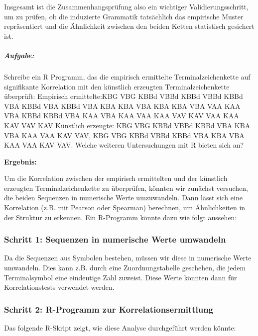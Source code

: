 \documentclass[
]{article}
\begin{document}
Insgesamt ist die Zusammenhangsprüfung also ein wichtiger
Validierungsschritt, um zu prüfen, ob die induzierte Grammatik
tatsächlich das empirische Muster repräsentiert und die Ähnlichkeit
zwischen den beiden Ketten statistisch gesichert ist.

\subparagraph{\texorpdfstring{\textbf{Aufgabe:}}{Aufgabe:}}\label{aufgabe}

Schreibe ein R Programm, das die empirisch ermittelte
Terminalzeichenkette auf signifikante Korrelation mit den künstlich
erzeugten Terminalzeichenkette überprüft: Empirisch ermittelte:KBG VBG
KBBd VBBd KBBd VBBd KBBd VBA KBBd VBA KBBd VBA KBA KBA VBA KBA KBA VBA
VAA KAA VBA KBBd KBBd VBA KAA VBA KAA VAA KAA VAV KAV VAA KAA KAV VAV
KAV Künstlich erzeugte: KBG VBG KBBd VBBd KBBd VBA KBA VBA KAA VAA KAV
VAV, KBG VBG KBBd VBBd KBBd VBA KBA VBA KAA VAA KAV VAV. Welche weiteren
Untersuchungen mit R bieten sich an?

\textbf{Ergebnis:}

Um die Korrelation zwischen der empirisch ermittelten und der künstlich
erzeugten Terminalzeichenkette zu überprüfen, könnten wir zunächst
versuchen, die beiden Sequenzen in numerische Werte umzuwandeln. Dann
lässt sich eine Korrelation (z.B. mit Pearson oder Spearman) berechnen,
um Ähnlichkeiten in der Struktur zu erkennen. Ein R-Programm könnte dazu
wie folgt aussehen:

\subsubsection{\texorpdfstring{\textbf{Schritt 1: Sequenzen in
numerische Werte
umwandeln}}{Schritt 1: Sequenzen in numerische Werte umwandeln}}\label{schritt-1-sequenzen-in-numerische-werte-umwandeln}

Da die Sequenzen aus Symbolen bestehen, müssen wir diese in numerische
Werte umwandeln. Dies kann z.B. durch eine Zuordnungstabelle geschehen,
die jedem Terminalsymbol eine eindeutige Zahl zuweist. Diese Werte
könnten dann für Korrelationstests verwendet werden.

\subsubsection{\texorpdfstring{\textbf{Schritt 2: R-Programm zur
Korrelationsermittlung}}{Schritt 2: R-Programm zur Korrelationsermittlung}}\label{schritt-2-r-programm-zur-korrelationsermittlung}

Das folgende R-Skript zeigt, wie diese Analyse durchgeführt werden
könnte:
\end{document}
